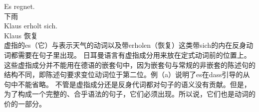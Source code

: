 \eal
\ex\label{Beispiel-es-regnet}
\gll Es regnet.\\
     \expl{} 下雨\\
\ex\label{Beispiel-erholt-sich}
\gll Klaus erholt sich.\\
     Klaus 恢复 \\
\zl
虚指的es（它）与表示天气的动词以及带erholen（恢复）这类带sich的内在反身动词都需要在句子里出现。
日耳曼语言有虚指成分用来放在定式动词前的位置上。这些虚指成分并不能用在德语的嵌套句中，因为嵌套句与常规的非嵌套的陈述句的结构不同，即陈述句要求变位动词位于第二位。例（a）说明了es在dass引导的从句中不能省略。
\eal
{}
\zl
不管是虚指成分还是反身代词都对句子的语义没有贡献。但是，为了构成一个完整的、合乎语法的句子，它们必须出现。所以说，它们也是动词的价的一部分。

